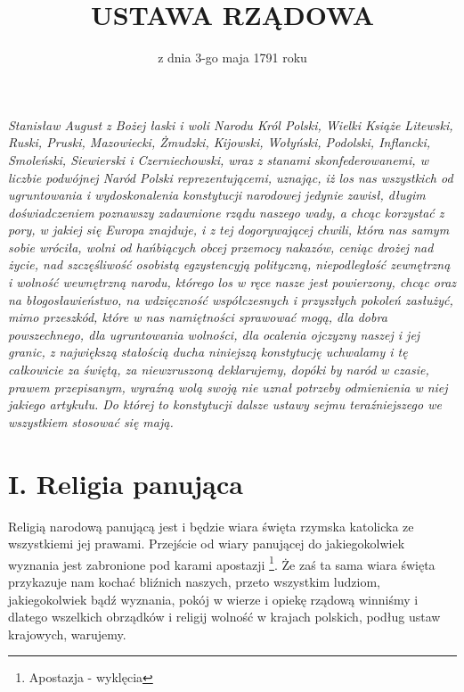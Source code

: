 \documentclass{book}
\begin{document}
\pagestyle{plain}

\title{USTAWA RZĄDOWA}
\date{z dnia 3-go maja 1791 roku}
\maketitle

\vspace*{\fill}
\begin{Large}
\begin{centering}
\textit{Stanisław August z Bożej łaski i woli Narodu Król Polski, Wielki Książe Litewski, Ruski, Pruski, Mazowiecki, Żmudzki, Kijowski, Wołyński, Podolski, Inflancki,  Smoleński, Siewierski i Czerniechowski, wraz z stanami skonfederowanemi, w liczbie podwójnej Naród Polski reprezentującemi, uznając, iż los nas wszystkich  od ugruntowania i wydoskonalenia konstytucji narodowej jedynie zawisł, długim doświadczeniem poznawszy zadawnione rządu naszego wady, a chcąc korzystać z pory, w jakiej się Europa znajduje, i z tej dogorywającej chwili, która nas samym sobie wróciła, wolni od hańbiących obcej przemocy nakazów, ceniąc drożej nad życie,  nad szczęśliwość osobistą egzystencyją polityczną, niepodległość zewnętrzną i wolność wewnętrzną narodu, którego los w ręce nasze jest powierzony,  chcąc oraz na błogosławieństwo, na wdzięczność współczesnych i przyszłych pokoleń zasłużyć, mimo przeszkód, które w nas namiętności sprawować mogą,  dla dobra powszechnego, dla ugruntowania wolności, dla ocalenia ojczyzny naszej i jej granic, z największą stałością ducha niniejszą konstytucję uchwalamy  i tę całkowicie za świętą, za niewzruszoną deklarujemy, dopóki by naród w czasie,  prawem przepisanym, wyraźną  wolą swoją nie uznał potrzeby odmienienia w niej jakiego artykułu.  Do której to konstytucji dalsze ustawy sejmu teraźniejszego we wszystkiem stosować się mają.}
\end{centering}
\end{Large}

\newpage
{} 

 
\section*{I. Religia panująca}

 Religią narodową panującą jest i będzie wiara święta rzymska katolicka ze wszystkiemi jej prawami.  Przejście od wiary panującej do jakiegokolwiek wyznania jest zabronione pod karami apostazji \footnote{Apostazja - wyklęcia}. Że zaś ta sama wiara święta przykazuje nam kochać bliźnich naszych, przeto wszystkim ludziom, jakiegokolwiek bądź wyznania,  pokój w wierze i opiekę rządową winniśmy i dlatego wszelkich obrządków i religij wolność w krajach polskich, podług ustaw krajowych, warujemy.  
\end{document}

